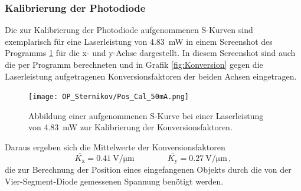         \subsubsection{Kalibrierung der Photodiode}
            Die zur Kalibrierung der Photodiode aufgenommenen S-Kurven sind exemplarisch für eine Laserleistung von \SI{4.83}{\milli\watt} in einem Screenshot des Programms \ref{fig:pos_cal} für die x- und 
            y-Achse dargestellt. In diesem Screenshot sind auch die per Programm berechneten und in Grafik \ref{fig:Konversion} gegen die Laserleistung aufgetragenen Konversionsfaktoren der beiden Achsen 
            eingetragen.
            \FloatBarrier
            \begin{figure}[h]
            \centering
            \texttt{[image: OP\_Sternikov/Pos\_Cal\_50mA.png]}
            \caption{Abbildung einer aufgenommenen S-Kurve bei einer Laserleistung von \SI{4.83}{\milli\watt} zur Kalibrierung der Konversionsfaktoren.}
            \label{fig:pos_cal}
            \end{figure}
            \FloatBarrier
            \newpage
            Daraus ergeben sich die Mittelwerte der Konversionsfaktoren
            \begin{equation*}
                \overline{K_{\text{x}}} = \SI{0.41}{\volt\per\micro\metre} \qquad\qquad \overline{K_{\text{y}}} = \SI{0.27}{\volt\per\micro\metre} \,,
            \end{equation*}
            die zur Berechnung der Position eines eingefangenen Objekts durch die von der Vier-Segment-Diode gemessenen Spannung benötigt werden.

